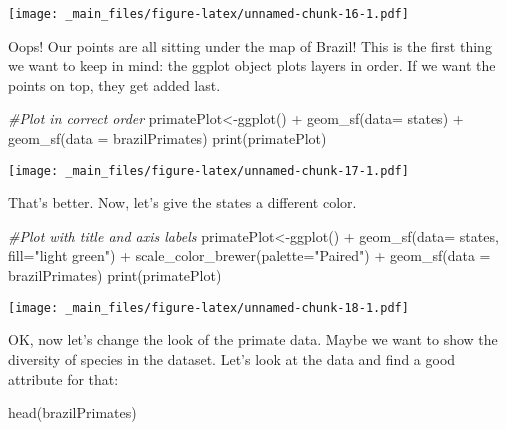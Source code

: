 \documentclass[
]{book}
\newenvironment{Shaded}{\begin{snugshade}}{\end{snugshade}}
\newcommand{\AttributeTok}[1]{\textcolor[rgb]{0.77,0.63,0.00}{#1}}
\newcommand{\CommentTok}[1]{\textcolor[rgb]{0.56,0.35,0.01}{\textit{#1}}}
\newcommand{\FunctionTok}[1]{\textcolor[rgb]{0.00,0.00,0.00}{#1}}
\newcommand{\NormalTok}[1]{#1}
\newcommand{\OtherTok}[1]{\textcolor[rgb]{0.56,0.35,0.01}{#1}}
\newcommand{\SpecialCharTok}[1]{\textcolor[rgb]{0.00,0.00,0.00}{#1}}
\newcommand{\StringTok}[1]{\textcolor[rgb]{0.31,0.60,0.02}{#1}}
\begin{document}
\texttt{[image: \_main\_files/figure-latex/unnamed-chunk-16-1.pdf]}

Oops! Our points are all sitting under the map of Brazil! This is the first thing we want to keep in mind: the ggplot object plots layers in order. If we want the points on top, they get added last.

\begin{Shaded}
\begin{Highlighting}[]
\CommentTok{\#Plot in correct order}
\NormalTok{primatePlot}\OtherTok{\textless{}{-}}\FunctionTok{ggplot}\NormalTok{() }\SpecialCharTok{+} 
  \FunctionTok{geom\_sf}\NormalTok{(}\AttributeTok{data=}\NormalTok{ states) }\SpecialCharTok{+}
  \FunctionTok{geom\_sf}\NormalTok{(}\AttributeTok{data =}\NormalTok{ brazilPrimates) }
\FunctionTok{print}\NormalTok{(primatePlot)}
\end{Highlighting}
\end{Shaded}

\texttt{[image: \_main\_files/figure-latex/unnamed-chunk-17-1.pdf]}

That's better. Now, let's give the states a different color.

\begin{Shaded}
\begin{Highlighting}[]
\CommentTok{\#Plot with title and axis labels}
\NormalTok{primatePlot}\OtherTok{\textless{}{-}}\FunctionTok{ggplot}\NormalTok{() }\SpecialCharTok{+} 
  \FunctionTok{geom\_sf}\NormalTok{(}\AttributeTok{data=}\NormalTok{ states, }\AttributeTok{fill=}\StringTok{"light green"}\NormalTok{) }\SpecialCharTok{+}
  \FunctionTok{scale\_color\_brewer}\NormalTok{(}\AttributeTok{palette=}\StringTok{"Paired"}\NormalTok{) }\SpecialCharTok{+}
  \FunctionTok{geom\_sf}\NormalTok{(}\AttributeTok{data =}\NormalTok{ brazilPrimates)}
\FunctionTok{print}\NormalTok{(primatePlot)}
\end{Highlighting}
\end{Shaded}

\texttt{[image: \_main\_files/figure-latex/unnamed-chunk-18-1.pdf]}

OK, now let's change the look of the primate data. Maybe we want to show the diversity of species in the dataset. Let's look at the data and find a good attribute for that:

\begin{Shaded}
\begin{Highlighting}[]
\FunctionTok{head}\NormalTok{(brazilPrimates)}
\end{Highlighting}
\end{Shaded}
\end{document}
